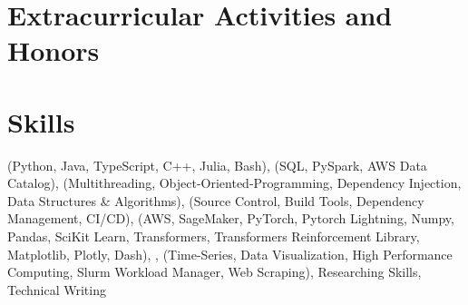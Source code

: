\documentclass{ExpressiveResume}
\begin{document}
\section{Extracurricular Activities and Honors}



\section{Skills}
\noindent
{} (Python, Java, TypeScript, C++, Julia, Bash),
 (SQL, PySpark, AWS Data Catalog),
 (Multithreading, Object-Oriented-Programming, Dependency Injection, Data Structures \& Algorithms),
 (Source Control, Build Tools, Dependency Management, CI/CD),
 (AWS, SageMaker, PyTorch, Pytorch Lightning, Numpy, Pandas, SciKit Learn, Transformers, Transformers Reinforcement Library,
Matplotlib, Plotly, Dash),
,
(Time-Series, Data
Visualization, High Performance Computing, Slurm
Workload Manager, Web Scraping),
Researching Skills, Technical Writing
\end{document}
